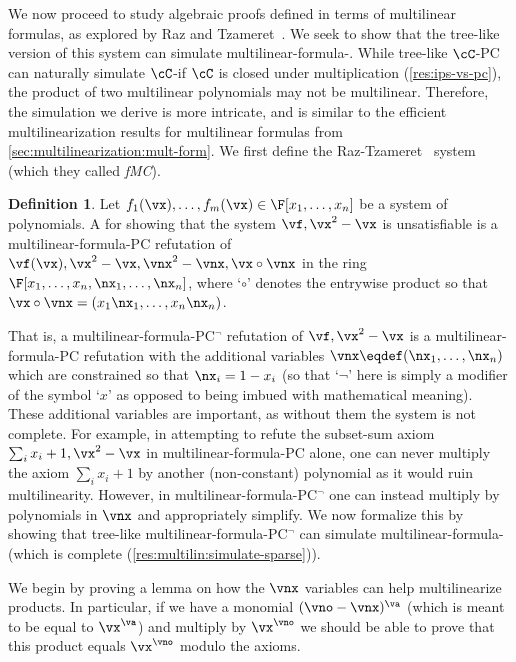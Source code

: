 \documentclass[11pt]{article}
\numberwithin{equation}{section}
\theoremstyle{definition}
\newtheorem{definition}[theorem]{Definition}
\theoremstyle{plain}
\begin{document}
We now proceed to study algebraic proofs defined in terms of multilinear formulas, as explored by Raz and Tzameret~\cite{RazTzameret08a,RazTzameret08b}.  We seek to show that the tree-like version of this system can simulate multilinear-formula-\lIPS.  While tree-like $\cC$-PC can naturally simulate $\cC$-\lIPS if $\cC$ is closed under multiplication (\autoref{res:ips-vs-pc}), the product of two multilinear polynomials may not be multilinear.
Therefore, %
the simulation we derive is more intricate, and is similar to the efficient multilinearization results for multilinear formulas from \autoref{sec:multilinearization:mult-form}. We first define the Raz-Tzameret~\cite{RazTzameret08a,RazTzameret08b}  system (which they called \emph{fMC}).

\begin{definition}\label{defn:pc:multlin}
        Let $f_1(\vx),\ldots,f_m(\vx)\in\F[x_1,\ldots,x_n]$ be a system of polynomials. A  for showing that the system $\vf,\vx^2-\vx$ is unsatisfiable is a multilinear-formula-PC refutation of $\vf(\vx),\vx^2-\vx,\vnx^2-\vnx,\vx\circ\vnx$ in the ring $\F[x_1,\ldots,x_n,\nx_1,\ldots,\nx_n]$, where `$\circ$' denotes the
%
entrywise  %
product so that $\vx\circ\vnx=(x_1\nx_1,\ldots,x_n\nx_n)$.
\end{definition}

That is, a multilinear-formula-PC$^\neg$ refutation of $\vf,\vx^2-\vx$ is a multilinear-formula-PC refutation with the additional variables $\vnx\eqdef(\nx_1,\ldots,\nx_n)$ which are constrained so that $\nx_i=1-x_i$ (so that `$\neg$' here is simply a modifier of the symbol `$x$' as opposed to being imbued with mathematical meaning).  These additional variables are important, as without them the system is not complete. For example, in attempting to refute the subset-sum axiom $\sum_i x_i+1,\vx^2-\vx$ in multilinear-formula-PC alone, one can never multiply the axiom $\sum_i x_i+1$ by another (non-constant) polynomial as it would ruin multilinearity.  However, in multilinear-formula-PC$^\neg$ one can instead multiply by polynomials in $\vnx$ and appropriately simplify.  We now formalize this by showing that tree-like multilinear-formula-PC$^\neg$ can simulate multilinear-formula-\lbIPS (which is complete (\autoref{res:multilin:simulate-sparse})).

We begin by proving a lemma on how the $\vnx$ variables can help multilinearize products.  In particular, if we have a monomial $(\vno-\vnx)^\va$ (which is meant to be equal to $\vx^\va$) and multiply by $\vx^\vno$ we should be able to prove that this product equals $\vx^\vno$ modulo the axioms.
\end{document}
